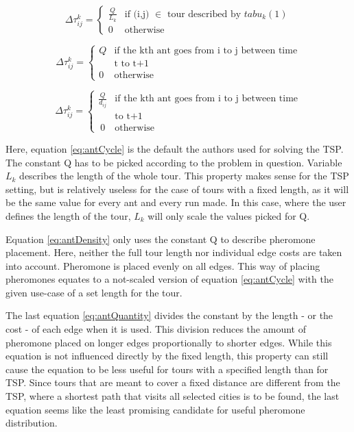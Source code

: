 \begin{equation}\label{eq:antCycle}
	\Delta\tau_{ij}^k = \begin{cases}
			\frac{Q}{L_k} &\text{if (i,j) $\in$ tour described by $tabu_k(1)$} \\
			0 &\text{otherwise}
	\end{cases}	
\end{equation}


\begin{equation}\label{eq:antDensity}
	\Delta\tau_{ij}^k = \begin{cases}
	Q &\text{if the kth ant goes from i to j between time} \\
	&\text{t to t+1} \\
	0 &\text{otherwise}
\end{cases}	
\end{equation}


\begin{equation}\label{eq:antQuantity}
	\Delta\tau_{ij}^k = \begin{cases}
	\frac{Q}{d_{ij}} &\text{if the kth ant goes from i to j between time} \\
		&\text{to t+1} \\\
	0 &\text{otherwise}
\end{cases}	
\end{equation}

Here, equation \ref{eq:antCycle} is the default the authors used for solving the TSP.
The constant Q has to be picked according to the problem in question.
Variable $L_k$ describes the length of the whole tour.
This property makes sense for the TSP setting, but is relatively useless for the case of tours with a fixed length, as it will be the same value for every ant and every run made.
In this case, where the user defines the length of the tour, $L_k$ will only scale the values picked for Q\cite{dorigo_ant_1996}.

Equation \ref{eq:antDensity} only uses the constant Q to describe pheromone placement. 
Here, neither the full tour length nor individual edge costs are taken into account. 
Pheromone is placed evenly on all edges.
This way of placing pheromones equates to a not-scaled version of equation \ref{eq:antCycle} with the given use-case of a set length for the tour\cite{dorigo_ant_1996}.

The last equation \ref{eq:antQuantity} divides the constant by the length - or the cost - of each edge when it is used. 
This division reduces the amount of pheromone placed on longer edges proportionally to shorter edges. 
While this equation is not influenced directly by the fixed length, this property can still cause the equation to be less useful for tours with a specified length than for TSP.
Since tours that are meant to cover a fixed distance are different from the TSP, where a shortest path that visits all selected cities is to be found, the last equation seems like the least promising candidate for useful pheromone distribution\cite{dorigo_ant_1996}.

